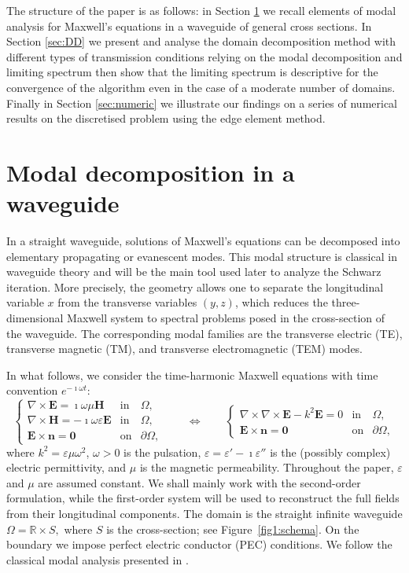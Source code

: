 \documentclass[smallextended]{svjour3}       %
\newcommand{\bfE}{{\mathbf{E}}}
\newcommand{\bfH}{{\mathbf{H}}}
\begin{document}
The structure of the paper is as follows: in Section \ref{sec:Modal} we recall elements of modal analysis for Maxwell's equations in a waveguide of general cross sections. In Section \ref{sec:DD} we present and analyse the domain decomposition method with different types of transmission conditions relying on the modal decomposition and limiting spectrum then show that the limiting spectrum is descriptive for the convergence of the algorithm even in the case of a moderate number of domains. Finally in Section \ref{sec:numeric} we illustrate our findings on a series of numerical results on the discretised problem using the edge element method. 


\section{Modal decomposition in a waveguide}
\label{sec:Modal}

In a straight waveguide, solutions of Maxwell's equations can be decomposed into elementary propagating or evanescent modes. This modal structure is classical in waveguide theory and will be the main tool used later to analyze the Schwarz iteration. More precisely, the geometry allows one to separate the longitudinal variable $x$ from the transverse variables $(y,z)$, which reduces the three-dimensional Maxwell system to spectral problems posed in the cross-section of the waveguide. The corresponding modal families are the transverse electric (TE), transverse magnetic (TM), and transverse electromagnetic (TEM) modes.

In what follows, we consider the time-harmonic Maxwell equations with time convention $e^{-\imath\omega t}$:
\begin{equation}\label{Maxwell-eq}
\left\{
\begin{array}{lll}
\nabla\times \bfE = \imath\omega\mu \bfH & \text{in} & \Omega,\\
\nabla\times \bfH = -\imath\omega\varepsilon \bfE & \text{in} & \Omega,\\
\bfE\times \mathbf n = \mathbf 0 & \text{on} & \partial\Omega,
\end{array}
\right.
\qquad \Leftrightarrow \qquad
\left\{
\begin{array}{lll}
\nabla\times\nabla\times \bfE - k^2 \bfE = 0 & \text{in} & \Omega,\\
\bfE\times \mathbf n = \mathbf 0 & \text{on} & \partial\Omega,
\end{array}
\right.
\end{equation}
where $k^2=\varepsilon\mu\omega^2$, $\omega > 0$ is the pulsation, $\varepsilon=\varepsilon'-\imath\varepsilon''$ is the (possibly complex) electric permittivity, and $\mu$ is the magnetic permeability. Throughout the paper, $\varepsilon$ and $\mu$ are assumed constant. We shall mainly work with the second-order formulation, while the first-order system will be used to reconstruct the full fields from their longitudinal components. The domain is the straight infinite waveguide
\(
\Omega=\mathbb R\times S,
\)
where $S$ is the cross-section; see Figure~\ref{fig1:schema}. On the boundary we impose perfect electric conductor (PEC) conditions. We follow the classical modal analysis presented in \cite{Bonnet:2021:PGO}.
\end{document}
